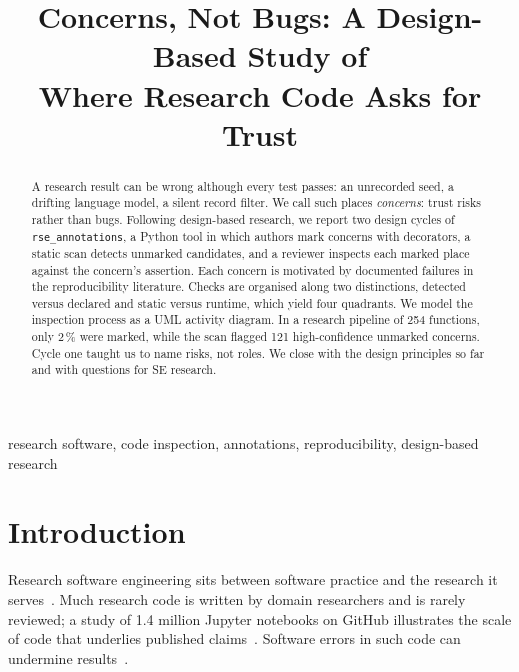 \documentclass[conference,10pt]{IEEEtran}
\begin{document}
\title{Concerns, Not Bugs: A Design-Based Study of\\Where Research Code Asks for Trust}

\author{
}

\maketitle

\begin{abstract}
A research result can be wrong although every test passes: an unrecorded seed, a drifting language model, a silent record filter. We call such places \emph{concerns}: trust risks rather than bugs. Following design-based research, we report two design cycles of \texttt{rse\_annotations}, a Python tool in which authors mark concerns with decorators, a static scan detects unmarked candidates, and a reviewer inspects each marked place against the concern's assertion. Each concern is motivated by documented failures in the reproducibility literature. Checks are organised along two distinctions, detected versus declared and static versus runtime, which yield four quadrants. We model the inspection process as a UML activity diagram. In a research pipeline of 254 functions, only 2\,\% were marked, while the scan flagged 121 high-confidence unmarked concerns. Cycle one taught us to name risks, not roles. We close with the design principles so far and with questions for SE research.
\end{abstract}

\begin{IEEEkeywords}
research software, code inspection, annotations, reproducibility, design-based research
\end{IEEEkeywords}

\section{Introduction}
Research software engineering sits between software practice and the research it serves~\cite{cohen2021}. Much research code is written by domain researchers and is rarely reviewed; a study of 1.4 million Jupyter notebooks on GitHub illustrates the scale of code that underlies published claims~\cite{pimentel2019}. Software errors in such code can undermine results~\cite{soergel2015}.
\end{document}
